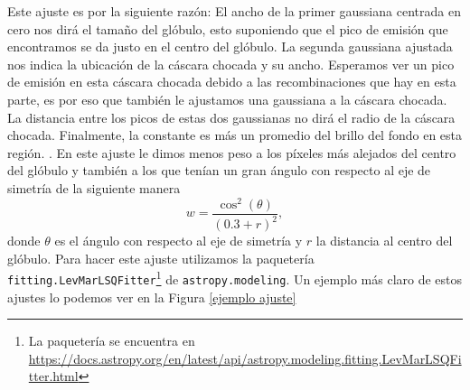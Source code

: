 \documentclass{book}
\begin{document}
Este ajuste es por la siguiente razón: El ancho de la primer gaussiana centrada en cero nos dirá el tamaño del glóbulo, esto suponiendo que el pico de emisión que encontramos se da justo en el centro del glóbulo. La segunda gaussiana ajustada nos indica la ubicación de la cáscara chocada y su ancho. Esperamos ver un pico de emisión en esta cáscara chocada debido a las recombinaciones que hay en esta parte, es por eso que también le ajustamos una gaussiana a la cáscara chocada. La distancia entre los picos de estas dos gaussianas no dirá el radio de la cáscara chocada. Finalmente, la constante es más un promedio del brillo del fondo en esta región. . En este ajuste le dimos menos peso a los píxeles más alejados del centro del glóbulo y también a los que tenían un gran ángulo con respecto al eje de simetría de la siguiente manera
\begin{equation}\label{eq: peso}
    w = \frac{\cos^2(\theta)}{(0.3+r)^2},
\end{equation}
donde $\theta$ es el ángulo con respecto al eje de simetría y $r$ la distancia al centro del glóbulo. Para hacer este ajuste utilizamos la paquetería   \verb|fitting.LevMarLSQFitter|\footnote{La paquetería se encuentra en \url{https://docs.astropy.org/en/latest/api/astropy.modeling.fitting.LevMarLSQFitter.html}} de \verb|astropy.modeling|.
Un ejemplo más claro de estos ajustes lo podemos ver en la Figura \ref{ejemplo ajuste}
\end{document}
